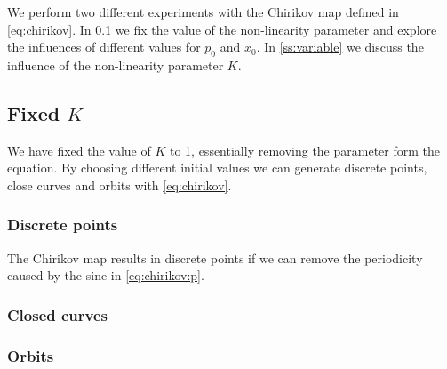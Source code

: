 We perform two different experiments with the Chirikov map defined in \cref{eq:chirikov}. In \cref{ss:fixed} we fix the value of the non-linearity parameter and explore the influences of different values for $p_0$ and $x_0$. In \cref{ss:variable} we discuss the influence of the non-linearity parameter $K$.

\subsection[]{Fixed $K$}
\label{ss:fixed}
	We have fixed the value of $K$ to 1, essentially removing the parameter form the equation. By choosing different initial values we can generate discrete points, close curves and orbits with \cref{eq:chirikov}.
	
	\subsubsection{Discrete points}
	The Chirikov map results in discrete points if we can remove the periodicity caused by the sine in \eqref{eq:chirikov:p}.




	
	\subsubsection{Closed curves}

	\subsubsection{Orbits}	



	

